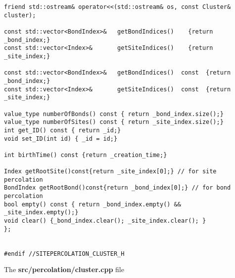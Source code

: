 \begin{lstlisting}[style=CStyle]
friend std::ostream& operator<<(std::ostream& os, const Cluster& cluster);

const std::vector<BondIndex>&   getBondIndices()    {return _bond_index;}
const std::vector<Index>&       getSiteIndices()    {return _site_index;}

const std::vector<BondIndex>&   getBondIndices()  const  {return _bond_index;}
const std::vector<Index>&       getSiteIndices()  const  {return _site_index;}

value_type numberOfBonds() const { return _bond_index.size();}
value_type numberOfSites() const { return _site_index.size();}
int get_ID() const { return _id;}
void set_ID(int id) { _id = id;}

int birthTime() const {return _creation_time;}

Index getRootSite()const{return _site_index[0];} // for site percolation
BondIndex getRootBond()const{return _bond_index[0];} // for bond percolation
bool empty() const { return _bond_index.empty() && _site_index.empty();}
void clear() {_bond_index.clear(); _site_index.clear(); }
};


#endif //SITEPERCOLATION_CLUSTER_H
\end{lstlisting}


The \textbf{src/percolation/cluster.cpp} file

